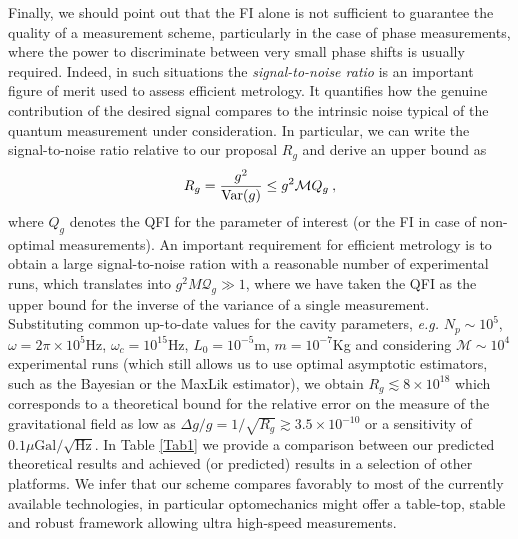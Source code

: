 \documentclass[aps,twocolumn,preprintnumbers,amsmath,amssymb]{revtex4}
\begin{document}
Finally, we should point out that the FI alone is not sufficient to guarantee the quality of a measurement scheme, particularly in the case of phase measurements, where the power to discriminate between very small phase shifts is usually required. Indeed, in such situations the \emph{signal-to-noise ratio} is an important figure of merit used to assess efficient metrology. It quantifies how the genuine contribution of the desired signal compares to the intrinsic noise typical of the quantum measurement under consideration.
In particular, we can write the signal-to-noise ratio relative to our proposal $R_g$ and derive an upper bound as
\begin{equation}
R_g=\frac{g^2}{{\rm Var}(g)}\leq g^2 \mathcal{M} Q_g \:,
\end{equation}
where $Q_g$ denotes the QFI for the parameter of interest (or the FI in case of non-optimal measurements). An important requirement for efficient metrology is to obtain a large signal-to-noise ration with a reasonable number of experimental runs, which translates into $g^2 M \mathcal{Q}_g \gg 1$, where we have taken the QFI as the upper bound for the inverse of the variance of a single measurement.\\
Substituting common up-to-date values for the cavity parameters, {\em e.g.} $N_p \sim 10^5$, $\omega=2\pi\times 10^5$Hz, $\omega_c=10^{15}$Hz, $L_0=10^{-5}$m, $m=10^{-7}$Kg and considering $\mathcal{M} \sim 10^4$ experimental runs (which still allows us to use optimal asymptotic estimators, such as the Bayesian or the MaxLik estimator), we obtain $R_g\lesssim 8\times10^{18}$ which corresponds to a theoretical bound for the relative error on the measure of the gravitational field as low as $\Delta g/g = 1/\sqrt{R_g} \gtrsim 3.5\times10^{-10}$  or a sensitivity of $0.1\mu \mathrm{Gal}/\sqrt{\mathrm{Hz}}$. In Table \ref{Tab1} we provide a comparison between our predicted theoretical results and achieved (or predicted) results in a selection of other platforms. We infer that our scheme compares favorably to most of the currently available technologies, in particular optomechanics might offer a table-top, stable and robust framework allowing ultra high-speed measurements.
\end{document}
